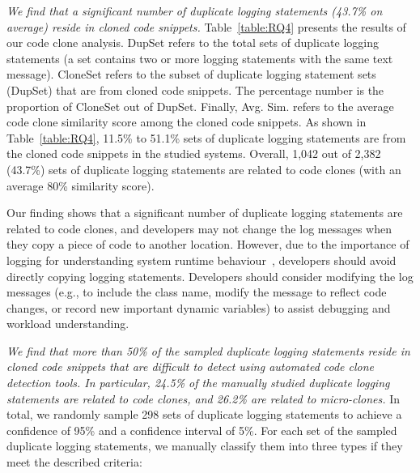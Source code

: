  {\em We find that a significant number of duplicate logging statements (43.7\% on average) reside in cloned code snippets.}
Table~\ref{table:RQ4} presents the results of our code clone analysis. {\sf DupSet} refers to the total sets of duplicate logging statements (a set contains two or more logging statements with the same text message). {\sf CloneSet} refers to the subset of duplicate logging statement sets ({\sf DupSet}) that are from cloned code snippets. The percentage number is the proportion of {\sf CloneSet} out of {\sf DupSet}. Finally, {\sf Avg. Sim.} refers to the average code clone similarity score among the cloned code snippets. As shown in Table~\ref{table:RQ4}, 11.5\% to 51.1\% sets of duplicate logging statements are from the cloned code snippets in the studied systems. Overall, 1,042 out of 2,382 (43.7\%) sets of duplicate logging statements are related to code clones (with an average 80\% similarity score).

Our finding shows that a significant number of duplicate logging statements are related to code clones, and developers may not change the log messages when they copy a piece of code to another location.
However, due to the importance of logging for understanding system runtime behaviour~\cite{petericseseip2017, Yuan:2012:CLP:2337223.2337236, Yuan:2011:ISD:1950365.1950369}, developers should avoid directly copying logging statements. Developers should consider modifying the log messages (e.g., to include the class name, modify the message to reflect code changes, or record new important dynamic variables) to assist debugging and workload understanding.



 {\em We find that more than 50\% of the sampled duplicate logging statements reside in cloned code snippets that are difficult to detect using automated code clone detection tools. In particular, 24.5\% of the manually studied duplicate logging statements are related to code clones, and 26.2\% are related to micro-clones. }
In total, we randomly sample 298 sets of duplicate logging statements to achieve a confidence of 95\% and a confidence interval of 5\%. For each set of the sampled duplicate logging statements, we manually classify them into three types if they meet the described criteria:

